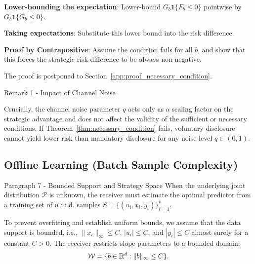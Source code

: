 \begin{guideblock}
\item \textbf{Lower-bounding the expectation}: Lower-bound $G_b \mathbf{1}\{F_b \le 0\}$ pointwise by $G_b \mathbf{1}\{G_b \le 0\}$.
\item \textbf{Taking expectations}: Substitute this lower bound into the risk difference.
\item \textbf{Proof by Contrapositive}: Assume the condition fails for all $b$, and show that this forces the strategic risk difference to be always non-negative.
\end{guideblock}
The proof is postponed to Section~\ref{app:proof_necessary_condition}.

\begin{sourceblock}{Remark 1 - Impact of Channel Noise}
\begin{remark}
Crucially, the channel noise parameter $q$ acts only as a scaling factor on the strategic advantage and does not affect the validity of the sufficient or necessary conditions. If Theorem~\ref{thm:necessary_condition} fails, voluntary disclosure cannot yield lower risk than mandatory disclosure for any noise level $q \in (0, 1)$.
\end{remark}
\end{sourceblock}

\begin{faqblock}
\faqanswers
{}
\end{faqblock}

\subsection{Offline Learning (Batch Sample Complexity)}
\label{sec:regression_offline}

\begin{sourceblock}{Paragraph 7 - Bounded Support and Strategy Space}
When the underlying joint distribution $\mathcal{P}$ is unknown, the receiver must estimate the optimal predictor from a training set of $n$ i.i.d. samples $S = \{(u_i, x_i, y_i)\}_{i=1}^n$. 

To prevent overfitting and establish uniform bounds, we assume that the data support is bounded, i.e., $\|x_i\|_\infty \le C$, $|u_i| \le C$, and $|y_i| \le C$ almost surely for a constant $C > 0$. The receiver restricts slope parameters to a bounded domain:
\begin{equation}
    \mathcal{W} = \{b \in \mathbb{R}^d : \|b\|_\infty \le C\}.
\end{equation}
\end{sourceblock}

